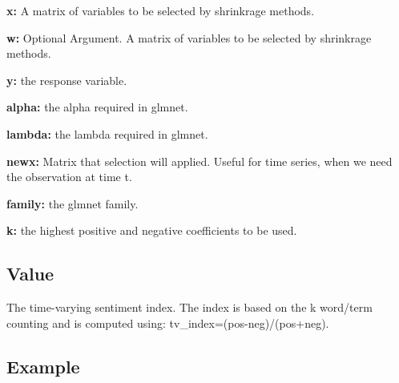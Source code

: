 \documentclass[]{article}
\begin{document}
\textbf{x:} A matrix of variables to be selected by shrinkrage methods.

\textbf{w:} Optional Argument. A matrix of variables to be selected by
shrinkrage methods.

\textbf{y:} the response variable.

\textbf{alpha:} the alpha required in glmnet.

\textbf{lambda:} the lambda required in glmnet.

\textbf{newx:} Matrix that selection will applied. Useful for time
series, when we need the observation at time t.

\textbf{family:} the glmnet family.

\textbf{k:} the highest positive and negative coefficients to be used.

\subsection{Value}\label{value-11}

The time-varying sentiment index. The index is based on the k word/term
counting and is computed using: tv\_index=(pos-neg)/(pos+neg).

\subsection{Example}\label{example-10}
\end{document}
